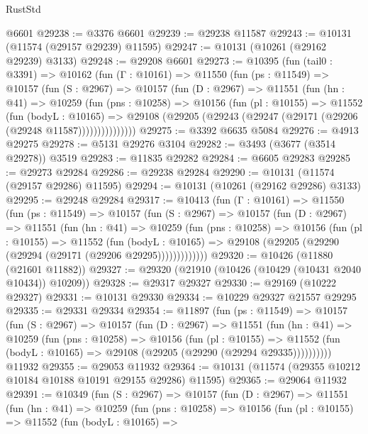 \begin{lexlean}{RustStd}
\begin{coremodule}
    @6601
@29238 := @3376 @6601
@29239 := @29238 @11587
@29243 := @10131 (@11574 (@29157 @29239) @11595)
@29247 := @10131 (@10261 (@29162 @29239) @3133)
@29248 := @29208 @6601
@29273 := @10395
    (fun (tail0 : @3391) =>
    @10162
      (fun (Γ : @10161) =>
      @11550
        (fun (ps : @11549) =>
        @10157
          (fun (S : @2967) =>
          @10157
            (fun (D : @2967) =>
            @11551
              (fun (hn : @41) =>
              @10259
                (fun (pns : @10258) =>
                @10156
                  (fun (pl : @10155) =>
                  @11552
                    (fun (bodyL : @10165) =>
                    @29108 (@29205 (@29243 (@29247 (@29171 (@29206 (@29248 @11587)))))))))))))))
@29275 := @3392 @6635 @5084
@29276 := @4913 @29275
@29278 := @5131 @29276 @3104
@29282 := @3493 (@3677 (@3514 @29278)) @3519
@29283 := @11835 @29282
@29284 := @6605 @29283
@29285 := @29273 @29284
@29286 := @29238 @29284
@29290 := @10131 (@11574 (@29157 @29286) @11595)
@29294 := @10131 (@10261 (@29162 @29286) @3133)
@29295 := @29248 @29284
@29317 := @10413
    (fun (Γ : @10161) =>
    @11550
      (fun (ps : @11549) =>
      @10157
        (fun (S : @2967) =>
        @10157
          (fun (D : @2967) =>
          @11551
            (fun (hn : @41) =>
            @10259
              (fun (pns : @10258) =>
              @10156
                (fun (pl : @10155) =>
                @11552
                  (fun (bodyL : @10165) =>
                  @29108 (@29205 (@29290 (@29294 (@29171 (@29206 @29295)))))))))))))
@29320 := @10426 (@11880 (@21601 @11882))
@29327 := @29320 (@21910 (@10426 (@10429 (@10431 @2040 @10434)) @10209))
@29328 := @29317 @29327
@29330 := @29169 (@10222 @29327)
@29331 := @10131 @29330
@29334 := @10229 @29327 @21557 @29295
@29335 := @29331 @29334
@29354 := @11897
    (fun (ps : @11549) =>
    @10157
      (fun (S : @2967) =>
      @10157
        (fun (D : @2967) =>
        @11551
          (fun (hn : @41) =>
          @10259
            (fun (pns : @10258) =>
            @10156
              (fun (pl : @10155) =>
              @11552 (fun (bodyL : @10165) => @29108 (@29205 (@29290 (@29294 @29335))))))))))
    @11932
@29355 := @29053 @11932
@29364 := @10131 (@11574 (@29355 @10212 @10184 @10188 @10191 @29155 @29286) @11595)
@29365 := @29064 @11932
@29391 := @10349
    (fun (S : @2967) =>
    @10157
      (fun (D : @2967) =>
      @11551
        (fun (hn : @41) =>
        @10259
          (fun (pns : @10258) =>
          @10156
            (fun (pl : @10155) =>
            @11552
              (fun (bodyL : @10165) =>

\end{coremodule}
\end{lexlean}
